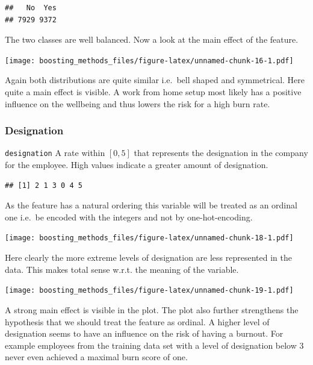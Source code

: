 \documentclass[
]{book}
\newenvironment{Shaded}{\begin{snugshade}}{\end{snugshade}}
\newcommand{\CommentTok}[1]{\textcolor[rgb]{0.56,0.35,0.01}{\textit{#1}}}
\newcommand{\FunctionTok}[1]{\textcolor[rgb]{0.00,0.00,0.00}{#1}}
\newcommand{\NormalTok}[1]{#1}
\newcommand{\SpecialCharTok}[1]{\textcolor[rgb]{0.00,0.00,0.00}{#1}}
\begin{document}
\begin{verbatim}
##   No  Yes 
## 7929 9372
\end{verbatim}

The two classes are well balanced. Now a look at the main effect of the feature.

\texttt{[image: boosting\_methods\_files/figure-latex/unnamed-chunk-16-1.pdf]}

Again both distributions are quite similar i.e.~bell shaped and symmetrical. Here quite a main effect is visible. A work from home setup most likely has a positive influence on the wellbeing and thus lowers the risk for a high burn rate.

\hypertarget{designation}{%
\subsubsection{Designation}\label{designation}}

\texttt{designation} A rate within \([0,5]\) that represents the designation in the company for the employee. High values indicate a greater amount of designation.

\begin{Shaded}
\end{Shaded}

\begin{verbatim}
## [1] 2 1 3 0 4 5
\end{verbatim}

As the feature has a natural ordering this variable will be treated as an ordinal one i.e.~be encoded with the integers and not by one-hot-encoding.

\texttt{[image: boosting\_methods\_files/figure-latex/unnamed-chunk-18-1.pdf]}

Here clearly the more extreme levels of designation are less represented in the data. This makes total sense w.r.t. the meaning of the variable.

\texttt{[image: boosting\_methods\_files/figure-latex/unnamed-chunk-19-1.pdf]}

A strong main effect is visible in the plot. The plot also further strengthens the hypothesis that we should treat the feature as ordinal. A higher level of designation seems to have an influence on the risk of having a burnout. For example employees from the training data set with a level of designation below 3 never even achieved a maximal burn score of one.
\end{document}
